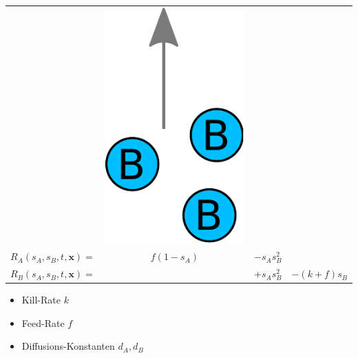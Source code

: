 \documentclass[12pt]{beamer}
\begin{document}
\begin{frame}
\begin{tabular}{ r c c c }
      &
      \includegraphics[scale=0.15]{Bilder/gs_kill.pdf}
	  \\
	  \(
		R_A(s_A,s_B,t,\bm{x})=
	  \)
	  &
	  \(
		f(1-s_A)
	  \)
	  &
	  \(
		- s_A s_B^2
	  \)
	  &
	  \\
	  \(
		R_B(s_A,s_B,t,\bm{x})=
	  \)
	  &
	  &
	  \(
		+ s_A s_B^2
	  \)
	  &
	  \(
		- (k + f) s_B
	  \)
	  \\
      \end{tabular}
      \renewcommand{\arraystretch}{1.0}

      \begin{itemize}
	  \item Kill-Rate $k$
	  \item Feed-Rate $f$
	  \item Diffusions-Konstanten $d_A, d_B$
      \end{itemize}
    
      \end{frame}
\end{document}
